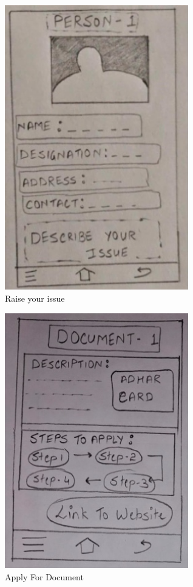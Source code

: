 \documentclass[acmtog]{acmart}
\begin{document}
\begin{figure}[H]
    \includegraphics[width=8cm]{Resources/RaiseIssue.jpg}
    \caption{Raise your issue}
    \label{fig:raise issue}
\end{figure}
\begin{figure}[H]
    \includegraphics[width=8cm]{Resources/ApplyDocument.jpg}
    \caption{Apply For Document}
    \label{fig:document}
\end{figure}
\end{document}
